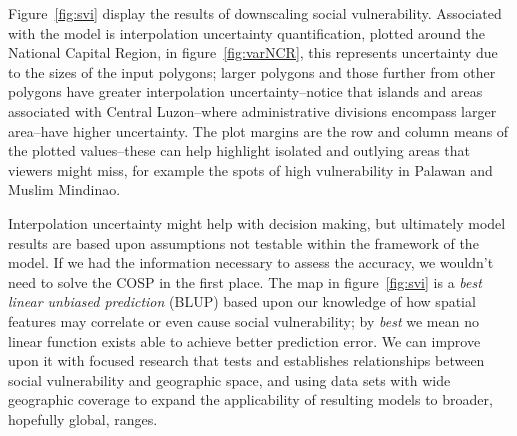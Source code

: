 \documentclass[]{interact}
\theoremstyle{plain}%
\theoremstyle{definition}
\theoremstyle{remark}
\begin{document}
\begin{figure}
  \centering
\end{figure}

Figure~\ref{fig:svi} display the results of downscaling social vulnerability.  Associated with the model is interpolation uncertainty quantification, plotted around the National Capital Region, in figure~\ref{fig:varNCR}, this represents uncertainty due to the sizes of the input polygons; larger polygons and those further from other polygons have greater interpolation uncertainty--notice that islands and areas associated with Central Luzon--where administrative divisions encompass larger area--have higher uncertainty.  The plot margins are the row and column means of the plotted values--these can help highlight isolated and outlying areas that viewers might miss, for example the spots of high vulnerability in Palawan and Muslim Mindinao.

Interpolation uncertainty might help with decision making, but ultimately model results are based upon assumptions not testable within the framework of the model.  If we had the information necessary to assess the accuracy, we wouldn't need to solve the COSP in the first place.  The map in figure~\ref{fig:svi} is a {\em best linear unbiased prediction} (BLUP) based upon our knowledge of how spatial features may correlate or even cause social vulnerability; by {\em best} we mean no linear function exists able to achieve better prediction error.  We can improve upon it with focused research that tests and establishes relationships between social vulnerability and geographic space, and using data sets with wide geographic coverage to expand the applicability of resulting models to broader, hopefully global, ranges.
\end{document}
